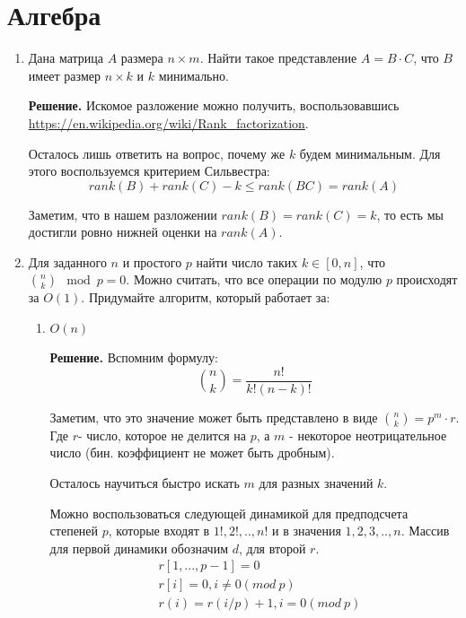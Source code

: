 \section*{Алгебра}
\begin{enumerate}
	\item Дана матрица $A$ размера $n \times m$. Найти такое представление $A = B \cdot C$, что $B$ имеет размер $n 
	\times k$ и $k$ минимально.
	
	\textbf{Решение.} Искомое разложение можно получить, воспользовавшись
	 \url{https://en.wikipedia.org/wiki/Rank_factorization}.
	 
	 Осталось лишь ответить на вопрос, почему же $k$ будем минимальным. Для этого воспользуемся критерием Сильвестра:
	 \begin{equation*}
	 	 rank(B) + rank(C) - k \leqslant rank(BC) = rank(A)
	 \end{equation*}
	
	Заметим, что в нашем разложении $rank(B) = rank(C) = k$, то есть мы достигли ровно нижней оценки на $rank(A)$.
	
	\item Для заданного $n$ и простого $p$ найти число таких $k \in [0, n]$, что $\binom{n}{k} \mod p = 0$. Можно 
	считать, что все операции по модулю $p$ происходят за $O(1)$. Придумайте алгоритм, который работает за:
	\begin{enumerate}
		\item $O(n)$
		
		\textbf{Решение.} Вспомним формулу:
		\begin{equation*}
		\binom{n}{k} = \frac{n!}{k!(n - k)!}
		\end{equation*}
		
		Заметим, что это значение может быть представлено в виде $\binom{n}{k} = p^m \cdot r$. Где $r$- число, 
		которое не делится на $p$, а $m$ - некоторое неотрицательное число (бин. коэффициент не может быть 
		дробным).
		
		Осталось научиться быстро искать $m$ для разных значений $k$.
		
		Можно воспользоваться следующей динамикой для предподсчета степеней $p$, которые входят в $1!, 2!, .., 
		n!$ и в значения $1,2,3, .., n$. Массив для первой динамики обозначим $d$, для второй $r$.
		\begin{align*}
			&r[1, ..., p - 1] = 0 \\
			&r[i] = 0, i \neq 0 (mod \ p) \\
			&r(i) = r(i / p) + 1, i = 0(mod \ p)
		\end{align*}
		

\end{enumerate}
\end{enumerate}

